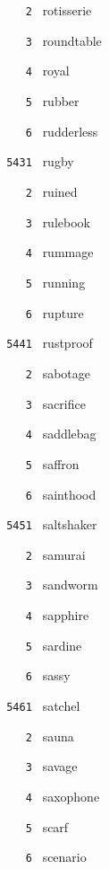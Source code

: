 \documentclass[11pt]{article}
\begin{document}
\begin{multicols}{6}
\noindent \texttt{ \ \ \ 2 } rotisserie  \par
\noindent \texttt{ \ \ \ 3 } roundtable  \par
\noindent \texttt{ \ \ \ 4 } royal  \par
\noindent \texttt{ \ \ \ 5 } rubber  \par
\noindent \texttt{ \ \ \ 6 } rudderless  \par
\vspace{3mm}
\noindent \texttt{ 5431 } rugby  \par
\noindent \texttt{ \ \ \ 2 } ruined  \par
\noindent \texttt{ \ \ \ 3 } rulebook  \par
\noindent \texttt{ \ \ \ 4 } rummage  \par
\noindent \texttt{ \ \ \ 5 } running  \par
\noindent \texttt{ \ \ \ 6 } rupture  \par
\vspace{3mm}
\noindent \texttt{ 5441 } rustproof  \par
\noindent \texttt{ \ \ \ 2 } sabotage  \par
\noindent \texttt{ \ \ \ 3 } sacrifice  \par
\noindent \texttt{ \ \ \ 4 } saddlebag  \par
\noindent \texttt{ \ \ \ 5 } saffron  \par
\noindent \texttt{ \ \ \ 6 } sainthood  \par
\vspace{3mm}
\noindent \texttt{ 5451 } saltshaker  \par
\noindent \texttt{ \ \ \ 2 } samurai  \par
\noindent \texttt{ \ \ \ 3 } sandworm  \par
\noindent \texttt{ \ \ \ 4 } sapphire  \par
\noindent \texttt{ \ \ \ 5 } sardine  \par
\noindent \texttt{ \ \ \ 6 } sassy  \par
\vspace{3mm}
\noindent \texttt{ 5461 } satchel  \par
\noindent \texttt{ \ \ \ 2 } sauna  \par
\noindent \texttt{ \ \ \ 3 } savage  \par
\noindent \texttt{ \ \ \ 4 } saxophone  \par
\noindent \texttt{ \ \ \ 5 } scarf  \par
\noindent \texttt{ \ \ \ 6 } scenario  \par

\end{multicols}
\end{document}
